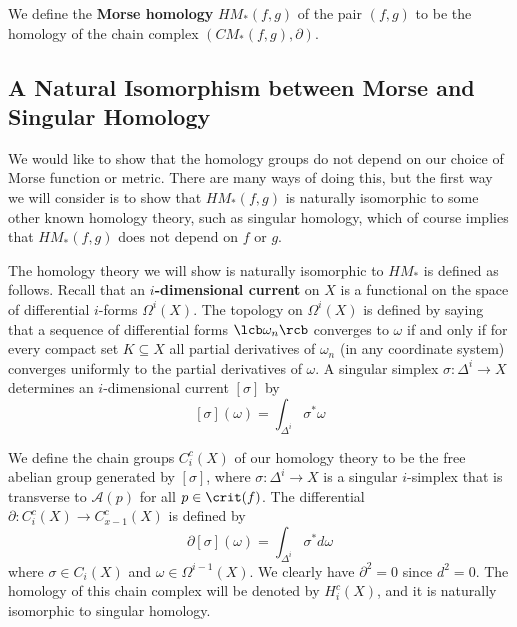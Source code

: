 We define the \textbf{Morse homology} $HM_*(f,g)$ of the pair $(f,g)$ to be the homology of the chain complex $(CM_*(f,g),\partial)$. 






\subsection{A Natural Isomorphism between Morse and Singular Homology}
\label{A Natural Isomorphism between Morse and Singular Homology}


We would like to show that the homology groups do not depend on our choice of Morse function or metric. There are many ways of doing this, but the first way we will consider is to show that $HM_*(f,g)$ is naturally isomorphic to some other known homology theory, such as singular homology, which of course implies that $HM_*(f,g)$ does not depend on $f$ or $g$.

The homology theory we will show is naturally isomorphic to $HM_*$ is defined as follows. Recall that an \textbf{$i$-dimensional current} on $X$ is a functional on the space of differential $i$-forms $\Omega^i(X)$. The topology on $\Omega^i(X)$ is defined by saying that a sequence of differential forms $\lcb \omega_n \rcb$ converges to $\omega$ if and only if for every compact set $K \subseteq X$ all partial derivatives of $\omega_n$ (in any coordinate system) converges uniformly to the partial derivatives of $\omega$. A singular simplex $\sigma : \Delta^i \rightarrow X$ determines an $i$-dimensional current $[\sigma]$ by 
\[ [\sigma](\omega) = \int_{\Delta^i} \sigma^* \omega \]


We define the chain groups $C_i^c(X)$ of our homology theory to be the free abelian group generated by $[\sigma]$, where $\sigma : \Delta^i \rightarrow X$ is a singular $i$-simplex that is transverse to $\mathscr A(p)$ for all $p \in \crit(f)$. The differential $\partial : C_i^c(X) \rightarrow C_{x-1}^c(X)$ is defined by
\[ \partial [\sigma] (\omega) = \int_{\Delta^i} \sigma^* d\omega \]
where $\sigma \in C_i(X)$ and $\omega \in \Omega^{i-1}(X)$. We clearly have $\partial^2=0$ since $d^2=0$. The homology of this chain complex will be denoted by $H_i^c(X)$, and it is naturally isomorphic to singular homology. 

